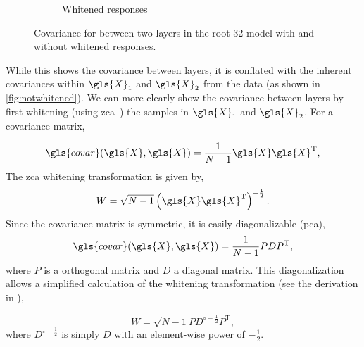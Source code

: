 \documentclass[thesis]{subfiles}
\begin{document}
\begin{figure}[tbp]
\begin{subfigure}[b]{0.3\textheight}
			\caption{Whitened responses}
			\label{fig:whitened}
		\end{subfigure}
		\caption[Inter-layer covariance with/without whitened responses]{Covariance for between two layers in the root-32  model with and without whitened responses.}
		\label{fig:whitevsnot}
	\end{figure}
	
	While this shows the covariance between layers, it is conflated with the inherent covariances within $\gls{X}_1$ and $\gls{X}_2$ from the data (as shown in \cref{fig:notwhitened}). We can more clearly show the covariance between layers by first whitening (using \gls{zca}~\citep{CIFAR10}) the samples in $\gls{X}_1$ and $\gls{X}_2$. For a covariance matrix,
	
	\begin{equation}
	\gls{covar}(\gls{X}, \gls{X}) = \frac{1}{N-1} \gls{X}\gls{X}^\textrm{T},
	\end{equation}
	The \gls{zca} whitening transformation is given by,
	\begin{equation}
	W = \sqrt{N-1}\left(\gls{X}\gls{X}^\textrm{T}\right)^{-\frac{1}{2}}.
	\end{equation}
	Since the covariance matrix is symmetric, it is easily diagonalizable (\ie \gls{pca}),
	\begin{align}
	\gls{covar}(\gls{X}, \gls{X}) &= \frac{1}{N-1} PDP^\textrm{T},\\
	\end{align}
	where $P$ is a orthogonal matrix and $D$ a diagonal matrix. This diagonalization allows a simplified calculation of the whitening transformation (see the derivation in \citet[Appendix A]{CIFAR10}),
	
	\begin{equation}
	W = \sqrt{N-1}PD^{\circ-\frac{1}{2}}P^\textrm{T},
	\end{equation}
	where $D^{\circ-\frac{1}{2}}$ is simply $D$ with an element-wise power of $-\frac{1}{2}$.
	
\end{document}
